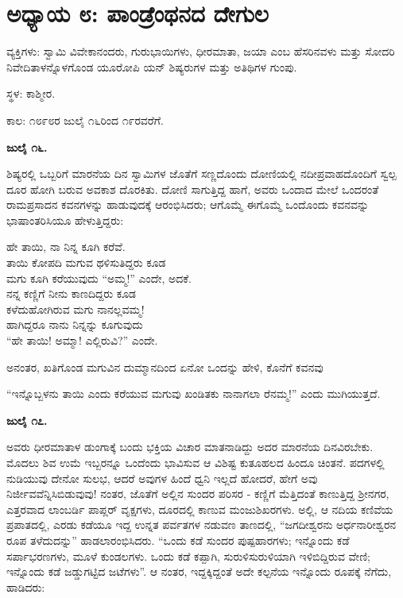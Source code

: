 
\chapter{ಅಧ್ಯಾಯ ೮: ಪಾಂಡ್ರೆಂಥನದ ದೇಗುಲ}

ವ್ಯಕ್ತಿಗಳು: ಸ್ವಾಮಿ ವಿವೇಕಾನಂದರು, ಗುರುಭಾಯಿಗಳು, ಧೀರಮಾತಾ, ಜಯಾ ಎಂಬ ಹೆಸರಿನವಳು ಮತ್ತು ಸೋದರಿ ನಿವೇದಿತಾಳನ್ನೊಳಗೊಂಡ ಯೂರೋಪಿ ಯನ್ ಶಿಷ್ಯರುಗಳ ಮತ್ತು ಅತಿಥಿಗಳ ಗುಂಪು.

ಸ್ಥಳ: ಕಾಶ್ಮೀರ.

ಕಾಲ: ೧೮೯೮ರ ಜುಲೈ ೧೬ರಿಂದ ೧೯ರವರೆಗೆ.

\textbf{ಜುಲೈ ೧೬.}

ಶಿಷ್ಯರಲ್ಲಿ ಒಬ್ಬರಿಗೆ ಮಾರನೆಯ ದಿನ ಸ್ವಾಮಿಗಳ ಜೊತೆಗೆ ಸಣ್ಣದೊಂದು ದೋಣಿಯಲ್ಲಿ ನದೀಪ್ರವಾಹದೊಂದಿಗೆ ಸ್ವಲ್ಪ ದೂರ ಹೋಗಿ ಬರುವ ಅವಕಾಶ ದೊರಕಿತು. ದೋಣಿ ಸಾಗುತ್ತಿದ್ದ ಹಾಗೆ, ಅವರು ಒಂದಾದ ಮೇಲೆ ಒಂದರಂತೆ ರಾಮಪ್ರಸಾದನ ಕವನಗಳನ್ನು ಹಾಡುವುದಕ್ಕೆ ಆರಂಭಿಸಿದರು; ಆಗೊಮ್ಮೆ ಈಗೊಮ್ಮೆ ಒಂದೊಂದು ಕವನವನ್ನು ಭಾಷಾಂತರಿಸಿಯೂ ಹೇಳುತ್ತಿದ್ದರು:

\begin{myquote}
ಹೇ ತಾಯಿ, ನಾ ನಿನ್ನ ಕೂಗಿ ಕರೆವೆ.\\ತಾಯಿ ಕೋಪದಿ ಮಗುವ ಥಳಿಸುತಿದ್ದರು ಕೂಡ\\ಮಗು ಕೂಗಿ ಕರೆಯುವುದು “ಅಮ್ಮ!” ಎಂದೇ, ಅದಕೆ.\\ನನ್ನ ಕಣ್ಣಿಗೆ ನೀನು ಕಾಣದಿದ್ದರು ಕೂಡ\\ಕಳೆದುಹೋಗಿರುವ ಮಗು ನಾನಲ್ಲವಮ್ಮ!\\ಹಾಗಿದ್ದರೂ ನಾನು ನಿನ್ನನ್ನು ಕೂಗುವುದು\\“ಹೇ ತಾಯಿ! ಅಮ್ಮಾ! ಎಲ್ಲಿರುವಿ?” ಎಂದೇ.
\end{myquote}

ಅನಂತರ, ಖತಿಗೊಂಡ ಮಗುವಿನ ದುಮ್ಮಾನದಿಂದ ಏನೋ ಒಂದನ್ನು ಹೇಳಿ, ಕೊನೆಗೆ ಕವನವು

“ಇನ್ನೊಬ್ಬಳನು ತಾಯಿ ಎಂದು ಕರೆಯುವ ಮಗುವು ಖಂಡಿತಕು ನಾನಾಗಲಾ ರೆನಮ್ಮ!” ಎಂದು ಮುಗಿಯುತ್ತದೆ.

\textbf{ಜುಲೈ ೧೭.}

ಅವರು ಧೀರಮಾತಾಳ ಡುಂಗಾಕ್ಕೆ ಬಂದು ಭಕ್ತಿಯ ವಿಚಾರ ಮಾತನಾಡಿದ್ದು ಅದರ ಮಾರನೆಯ ದಿನವಿರಬೇಕು. ಮೊದಲು ಶಿವ ಉಮೆ ಇಬ್ಬರನ್ನೂ ಒಂದೆಂದು ಭಾವಿಸುವ ಆ ವಿಶಿಷ್ಟ ಕುತೂಹಲದ ಹಿಂದೂ ಚಿಂತನೆ. ಪದಗಳಲ್ಲಿ ನುಡಿಯುವು ದೇನೋ ಸುಲಭ, ಆದರೆ ಅವುಗಳ ಹಿಂದೆ ಧ್ವನಿ ಇಲ್ಲದೆ ಹೋದರೆ, ಹೇಗೆ ಅವು ನಿರ್ಜೀವವೆನ್ನಿಸಿಬಿಡುವುವು! ನಂತರ, ಜೊತೆಗೆ ಅಲ್ಲಿನ ಸುಂದರ ಪರಿಸರ - ಕಣ್ಣಿಗೆ ಮೆತ್ತಿದಂತೆ ಕಾಣುತ್ತಿದ್ದ ಶ‍್ರೀನಗರ, ಎತ್ತರವಾದ ಲಾಂಬರ್ಡಿ ಪಾಪ್ಲರ್ ವೃಕ್ಷಗಳು, ದೂರದಲ್ಲಿ ಕಾಣುವ ಮಂಜುಶಿಖರಗಳು. ಅಲ್ಲಿ, ಆ ನದಿಯ ಕಣಿವೆಯ ಪ್ರಪಾತದಲ್ಲಿ, ಎರಡು ಕಡೆಯೂ ಇದ್ದ ಉನ್ನತ ಪರ್ವತಗಳ ನಡುವಣ ತಾಣದಲ್ಲಿ, “ಜಗದೀಶ್ವರನು ಅರ್ಧನಾರೀಶ್ವರನ ರೂಪ ತಳೆದುದನ್ನು” ಹಾಡಲಾರಂಭಿಸಿದರು. “ಒಂದು ಕಡೆ ಸುಂದರ ಪುಷ್ಪಹಾರಗಳು; ಇನ್ನೊಂದು ಕಡೆ ಸರ್ಪಾಭರಣಗಳು, ಮೂಳೆ ಕುಂಡಲಗಳು. ಒಂದು ಕಡೆ ಕಪ್ಪಾಗಿ, ಸುರುಳಿಸುರುಳಿಯಾಗಿ ಇಳಿಬಿದ್ದಿರುವ ವೇಣಿ; ಇನ್ನೊಂದು ಕಡೆ ಜಡ್ಡುಗಟ್ಟಿದ ಜಟೆಗಳು”. ಆ ನಂತರ, ಇದ್ದಕ್ಕಿದ್ದಂತೆ ಅದೇ ಕಲ್ಪನೆಯ ಇನ್ನೊಂದು ರೂಪಕ್ಕೆ ನೆಗೆದು, ಹಾಡಿದರು:

